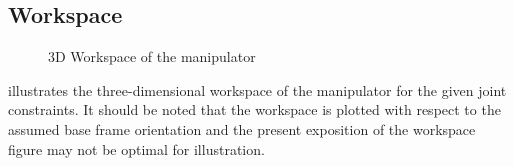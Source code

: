 \subsection{Workspace}
\begin{figure}[h!]
	\centering
	\scalebox{1}{}
	\caption{3D Workspace of the manipulator}
	\label{fig:workspace}
\end{figure}
 illustrates the three-dimensional workspace of the manipulator for the given joint constraints. It should be noted that the workspace is plotted with respect to the assumed base frame orientation and the present exposition of the workspace figure may not be optimal for illustration.